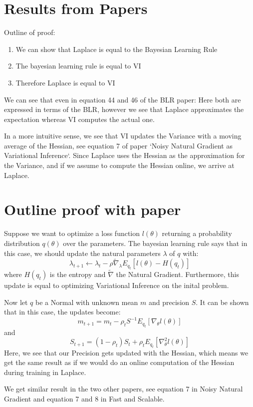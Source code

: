 \documentclass[a4paper]{scrartcl}
\begin{document}
  \section{Results from Papers}
      Outline of proof:
      \begin{enumerate}
        \item We can show that Laplace is equal to the Bayesian Learning Rule
        \item The bayesian learning rule is equal to VI 
        \item Therefore Laplace is equal to VI
      \end{enumerate}

      We can see that even in equation 44 and 46 of the BLR paper: Here both are
      expressed in terms of the BLR, however we see that Laplace approximates
      the expectation whereas VI computes the actual one.

      In a more intuitive sense, we see that VI updates the Variance with a
      moving average of the Hessian, see equation 7 of paper `Noisy Natural
      Gradient as Variational Inference`. Since Laplace uses the Hessian as the
      approximation for the Variance, and if we assume to compute the Hessian
      online, we arrive at Laplace.

  \section{Outline proof with paper}
    Suppose we want to optimize a loss function $l(\theta)$ returning a
    probability distribution $q(\theta)$ over the parameters. The bayesian
    learning rule says that in this case, we should update the natural
    parameters $\lambda$ of $q$ with:
    \begin{equation}
      \lambda_{t+1} \leftarrow \lambda_{t} - \rho \tilde{\nabla}_\lambda E_{q_t}[l(\theta) - H(q_t)]
    \end{equation}
    where $H(q_t)$ is the entropy and $\tilde{\nabla}$ the Natural Gradient.
    Furthermore, this update is equal to optimizing Variational Inference on the
    inital problem.

    Now let $q$ be a Normal with unknown mean $m$ and precision $S$. It can be shown that
    in this case, the updates become:
    \begin{equation}
      m_{t+1} = m_t - \rho_t S^{-1} E_{q_t} [\nabla_\theta l(\theta)]
    \end{equation}
    and 
    \begin{equation}
      S_{t+1} = (1 - \rho_t) S_t + \rho_t E_{q_t}[\nabla^2_\theta l(\theta)]
    \end{equation}
    Here, we see that our Precision gets updated with the Hessian, which means
    we get the same result as if we would do an online computation of the
    Hessian during training in Laplace.

    We get similar result in the two other papers, see equation 7 in Noisy
    Natural Gradient and equation 7 and 8 in Fast and Scalable.

    
\end{document}
